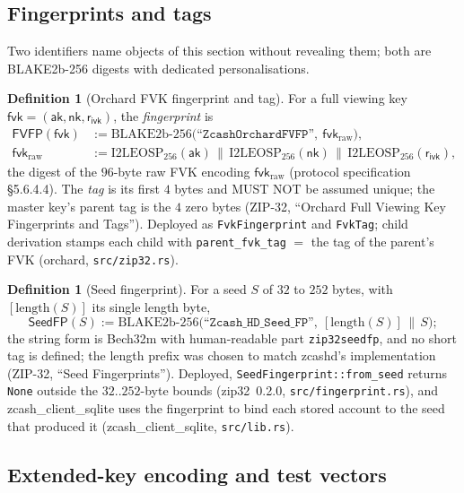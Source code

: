 \documentclass[11pt,a4paper]{article}
\theoremstyle{definition}
\newtheorem{definition}[theorem]{Definition}
\newcommand{\aksym}{\ensuremath{\mathsf{ak}}}
\newcommand{\nksym}{\ensuremath{\mathsf{nk}}}
\newcommand{\fvk}{\ensuremath{\mathsf{fvk}}}
\newcommand{\rivk}{\ensuremath{\mathsf{r_{ivk}}}}
\begin{document}
\subsection{Fingerprints and tags}\label{sec:zip32-fingerprints}

Two identifiers name objects of this section without revealing them; both
are BLAKE2b-256 digests with dedicated personalisations.

\begin{definition}[Orchard FVK fingerprint and tag]\label{def:fvk-fingerprint}
For a full viewing key $\fvk = (\aksym, \nksym, \rivk)$, the
\emph{fingerprint} is
\begin{align*}
\mathsf{FVFP}(\fvk) &:= \mathrm{BLAKE2b\text{-}256}\bigl(
\texttt{``ZcashOrchardFVFP''},\ \fvk_{\mathrm{raw}}\bigr), \\
\fvk_{\mathrm{raw}} &:= \mathrm{I2LEOSP}_{256}(\aksym) \,\|\,
\mathrm{I2LEOSP}_{256}(\nksym) \,\|\, \mathrm{I2LEOSP}_{256}(\rivk),
\end{align*}
the digest of the $96$-byte raw FVK encoding $\fvk_{\mathrm{raw}}$
(protocol specification \S5.6.4.4). The \emph{tag} is its first $4$ bytes
and MUST NOT be assumed unique; the master key's parent tag is the $4$
zero bytes (ZIP-32,
``Orchard Full Viewing Key Fingerprints and Tags''). Deployed as
\texttt{FvkFingerprint} and \texttt{FvkTag}; child derivation stamps each
child with \texttt{parent\_fvk\_tag} $=$ the tag of the parent's FVK
(\textsf{orchard}, \texttt{src/zip32.rs}).
\end{definition}

\begin{definition}[Seed fingerprint]\label{def:seed-fingerprint}
For a seed $S$ of $32$ to $252$ bytes, with $[\mathrm{length}(S)]$ its
single length byte,
\[
\mathsf{SeedFP}(S) := \mathrm{BLAKE2b\text{-}256}\bigl(
\texttt{``Zcash\_HD\_Seed\_FP''},\ [\mathrm{length}(S)] \,\|\, S\bigr);
\]
the string form is Bech32m with human-readable part
\texttt{zip32seedfp}, and no short tag is defined; the length prefix was
chosen to match \textsf{zcashd}'s implementation (ZIP-32, ``Seed
Fingerprints''). Deployed, \texttt{SeedFingerprint::from\_seed} returns
\texttt{None} outside the $32..252$-byte bounds (\textsf{zip32}~0.2.0,
\texttt{src/fingerprint.rs}), and \textsf{zcash\_client\_sqlite} uses the
fingerprint to bind each stored account to the seed that produced it
(\textsf{zcash\_client\_sqlite}, \texttt{src/lib.rs}).
\end{definition}

\subsection{Extended-key encoding and test vectors}\label{sec:zip32-encoding}
\end{document}

